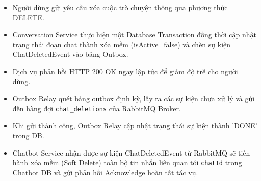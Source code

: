 \begin{itemize}
\item Người dùng gửi yêu cầu xóa cuộc trò chuyện thông qua phương thức DELETE.
\item Conversation Service thực hiện một Database Transaction đồng thời cập nhật trạng thái đoạn chat thành xóa mềm (isActive=false) và chèn sự kiện ChatDeletedEvent vào bảng Outbox.
\item Dịch vụ phản hồi HTTP 200 OK ngay lập tức để giảm độ trễ cho người dùng.
\item Outbox Relay quét bảng outbox định kỳ, lấy ra các sự kiện chưa xử lý và gửi đến hàng đợi \texttt{chat\_deletions} của RabbitMQ Broker.
\item Khi gửi thành công, Outbox Relay cập nhật trạng thái sự kiện thành 'DONE' trong DB.
\item Chatbot Service nhận được sự kiện ChatDeletedEvent từ RabbitMQ sẽ tiến hành xóa mềm (Soft Delete) toàn bộ tin nhắn liên quan tới \texttt{chatId} trong Chatbot DB và gửi phản hồi Acknowledge hoàn tất tác vụ.
\end{itemize}
